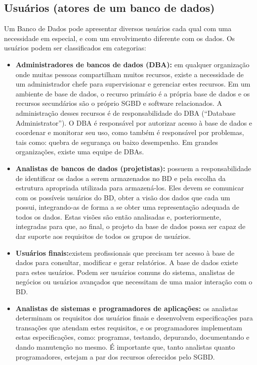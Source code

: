 \documentclass{article}
\begin{document}
\subsection{Usuários (atores de um banco de dados)}
Um Banco de Dados pode apresentar diversos usuários cada qual com uma necessidade em especial, e com um envolvimento diferente com os dados. Os usuários podem ser classificados em categorias:
\begin{itemize}
    \item \textbf{Administradores de bancos de dados (DBA):} em qualquer organização onde muitas pessoas compartilham muitos recursos, existe a necessidade de um administrador chefe para supervisionar e gerenciar estes recursos. Em um ambiente de base de dados, o recurso primário é a própria base de dados e os recursos secundários são o próprio SGBD e software relacionados. A administração desses recursos é de responsabilidade do DBA (“Database Administrator”). O DBA é responsável por autorizar acesso à base de dados e coordenar e monitorar seu uso, como também é responsável por problemas, tais como: quebra de segurança ou baixo desempenho. Em grandes organizações, existe uma equipe de DBAs.
    \item \textbf{Analistas de bancos de dados (projetistas):} possuem a responsabilidade de identificar os dados a serem armazenados no BD e pela escolha da estrutura apropriada utilizada para armazená-los. Eles devem se comunicar com os possíveis usuários do BD, obter a visão dos dados que cada um possui, integrando-as de forma a se obter uma representação adequada de todos os dados. Estas visões são então analisadas e, posteriormente, integradas para que, ao final, o projeto da base de dados possa ser capaz de dar suporte aos requisitos de todos os grupos de usuários.
    \item \textbf{Usuários finais:}existem profissionais que precisam ter acesso à base de dados para consultar, modificar e gerar relatórios. A base de dados existe para estes usuários. Podem ser usuários comuns do sistema, analistas de negócios ou usuários avançados que necessitam de uma maior interação com o BD. 
    \item \textbf{Analistas de sistemas e programadores de aplicações: }os analistas determinam os requisitos dos usuários finais e desenvolvem especificações para transações que atendam estes requisitos, e os programadores implementam estas especificações, como: programas, testando, depurando, documentando e dando manutenção no mesmo. É importante que, tanto analistas quanto programadores, estejam a par dos recursos oferecidos pelo SGBD.
\end{itemize}
\end{document}
